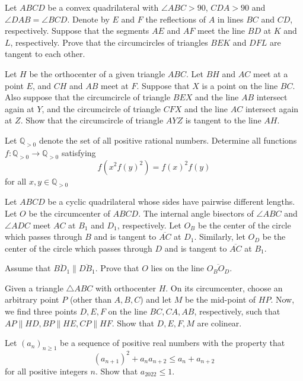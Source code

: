 \documentclass[11pt]{scrartcl}
\begin{document}
\begin{problem}[728988632553727]
Let $ABCD$ be a convex quadrilateral with $\angle ABC>90$, $CDA>90$ and $\angle DAB=\angle BCD$. Denote by $E$ and $F$ the reflections of $A$ in lines $BC$ and $CD$, respectively. Suppose that the segments $AE$ and $AF$ meet the line $BD$ at $K$ and $L$, respectively. Prove that the circumcircles of triangles $BEK$ and $DFL$ are tangent to each other.
\end{problem}
\begin{problem}[119129720704350]
Let $H$ be the orthocenter of a given triangle $ABC$. Let $BH$ and $AC$ meet at a point $E$, and $CH$ and $AB$ meet at $F$. Suppose that $X$ is a point on the line $BC$. Also suppose that the circumcircle of triangle $BEX$ and the line $AB$ intersect again at $Y$, and the circumcircle of triangle $CFX$ and the line $AC$ intersect again at $Z$.
Show that the circumcircle of triangle $AYZ$ is tangent to the line $AH$.
\end{problem}
\begin{problem}[8782897210450267045]
Let $\mathbb{Q}_{>0}$ denote the set of all positive rational numbers. Determine all functions $f:\mathbb{Q}_{>0}\to \mathbb{Q}_{>0}$ satisfying$$f(x^2f(y)^2)=f(x)^2f(y)$$for all $x,y\in\mathbb{Q}_{>0}$
\end{problem}
\begin{problem}[6025085618534905645]
	Let $ABCD$ be a cyclic quadrilateral whose sides have pairwise different lengths. Let $O$ be the circumcenter of $ABCD$. The internal angle bisectors of $\angle ABC$ and $\angle ADC$ meet $AC$ at $B_1$ and $D_1$, respectively. Let $O_B$ be the center of the circle which passes through $B$ and is tangent to $\overline{AC}$ at $D_1$. Similarly, let $O_D$ be the center of the circle which passes through $D$ and is tangent to $\overline{AC}$ at $B_1$.

Assume that $\overline{BD_1} \parallel \overline{DB_1}$. Prove that $O$ lies on the line $\overline{O_BO_D}$.
\end{problem}
\begin{problem}[296367141382799]
Given a triangle $ \triangle{ABC} $ with orthocenter $ H $. On its circumcenter, choose an arbitrary point $ P $ (other than $ A,B,C $) and let $ M $ be the mid-point of $ HP $. Now, we find three points $ D,E,F $ on the line $ BC, CA, AB $, respectively, such that $ AP \parallel HD, BP \parallel HE, CP \parallel HF $. Show that $ D, E, F, M $ are colinear.
\end{problem}
\begin{problem}[633974672407561]
Let $(a_n)_{n\geq 1}$ be a sequence of positive real numbers with the property that
$$(a_{n+1})^2 + a_na_{n+2} \leq a_n + a_{n+2}$$for all positive integers $n$. Show that $a_{2022}\leq 1$.
\end{problem}
\end{document}
